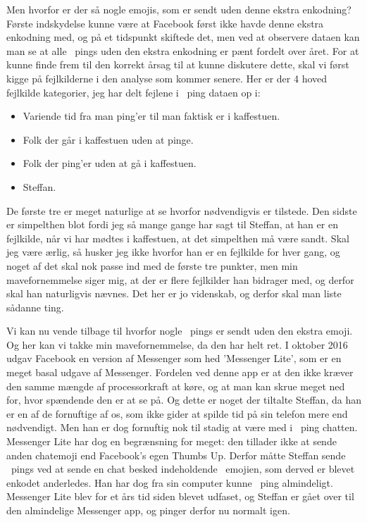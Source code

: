 \begin{article}
Men hvorfor er der så nogle emojis, som er sendt uden denne ekstra enkodning?
Første indskydelse kunne være at Facebook først ikke havde denne ekstra enkodning med, og på et tidspunkt skiftede det, men ved at observere dataen kan man se at alle \coffee\ pings uden den ekstra enkodning er pænt fordelt over året.
For at kunne finde frem til den korrekt årsag til at kunne diskutere dette, skal vi først kigge på fejlkilderne i den analyse som kommer senere. Her er der 4 hoved fejlkilde kategorier, jeg har delt fejlene i \coffee\ ping dataen op i:
\begin{itemize}
	\item Variende tid fra man ping'er til man faktisk er i kaffestuen.
	\item Folk der går i kaffestuen uden at pinge.
	\item Folk der ping'er uden at gå i kaffestuen.
	\item Steffan.
\end{itemize}
De første tre er meget naturlige at se hvorfor nødvendigvis er tilstede. Den sidste er simpelthen blot fordi jeg så mange gange har sagt til Steffan, at han er en fejlkilde, når vi har mødtes i kaffestuen, at det simpelthen må være sandt. Skal jeg være ærlig, så husker jeg ikke hvorfor han er en fejlkilde for hver gang, og noget af det skal nok passe ind med de første tre punkter, men min mavefornemmelse siger mig, at der er flere fejlkilder han bidrager med, og derfor skal han naturligvis nævnes. Det her er jo videnskab, og derfor skal man liste sådanne ting.

Vi kan nu vende tilbage til hvorfor nogle \coffee\ pings er sendt uden den ekstra emoji. Og her kan vi takke min mavefornemmelse, da den har helt ret.
I oktober 2016 udgav Facebook en version af Messenger som hed 'Messenger Lite', som er en meget basal udgave af Messenger. Fordelen ved denne app er at den ikke kræver den samme mængde af processorkraft at køre, og at man kan skrue meget ned for, hvor spændende den er at se på. Og dette er noget der tiltalte Steffan, da han er en af de fornuftige af os, som ikke gider at spilde tid på sin telefon mere end nødvendigt. Men han er dog fornuftig nok til stadig at være med i \coffee\ ping chatten. Messenger Lite har dog en begrænsning for meget: den tillader ikke at sende anden chatemoji end Facebook's egen Thumbs Up. Derfor måtte Steffan sende \coffee\ pings ved at sende en chat besked indeholdende \coffee\ emojien, som derved er blevet enkodet anderledes. Han har dog fra sin computer kunne \coffee\ ping almindeligt.
Messenger Lite blev for et års tid siden blevet udfaset, og Steffan er gået over til den almindelige Messenger app, og pinger derfor nu normalt igen.


\end{article}
